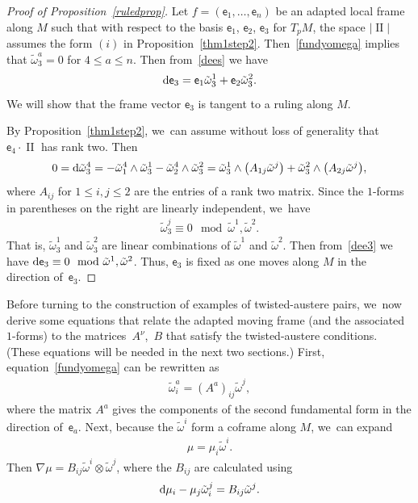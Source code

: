 \documentclass[pdftex]{sigma}
\def\ve{\mathsf{e}}
\def\II{\operatorname{II}} %
\def\tw{\tilde\omega}
\def\wt{\tilde\omega}
\numberwithin{equation}{section}
\begin{document}
\begin{proof}[Proof of Proposition~\ref{ruledprop}]
Let $f=(\ve_1, \dots, \ve_n)$ be an adapted local frame along $M$ such that with respect to the basis $\ve_1$, $\ve_2$, $\ve_3$ for $T_p M$, the space $|\II|$ assumes the form $(i)$ in Proposition~\ref{thm1step2}. Then~\eqref{fundyomega} implies that $\wt^a_3=0$ for $4 \le a \le n$. Then from~\eqref{dees} we have
\begin{gather} \label{dee3}
{\rm d}\ve_3 = \ve_1 \wt^1_3 + \ve_2 \wt^2_3.
\end{gather}
We will show that the frame vector $\ve_3$ is tangent to a ruling along $M$.

By Proposition~\ref{thm1step2}, we~can assume without loss of generality that $\ve_4 \cdot \II$ has rank two. Then
\begin{gather*}
0 = {\rm d}\wt^4_3 = -\wt^4_1 \wedge \wt^1_3 - \wt^4_2 \wedge \wt^2_3 = \wt^1_3 \wedge \big(A_{1j} \wt^j\big) + \wt^2_3 \wedge \big(A_{2j} \wt^j\big),
\end{gather*}
where $A_{ij}$ for $1\le i,j \le 2$ are the entries of a rank two matrix. Since the $1$-forms in parentheses on the right are linearly independent, we~have
\begin{gather} \label{noturn}
\wt^j_3 \equiv 0 \mod \wt^1, \wt^2.
\end{gather}
That is, $\wt^1_3$ and $\wt^2_3$ are linear combinations of $\wt^1$ and $\wt^2$. Then from~\eqref{dee3} we have ${\rm d}\ve_3 \equiv 0 \mod \wt^1, \wt^2$. Thus, $\ve_3$ is fixed as one moves along $M$ in the direction of~$\ve_3$.
\end{proof}

Before turning to the construction of examples of twisted-austere pairs, we~now derive some equations that relate the adapted moving frame (and the associated
$1$-forms) to the matri\-ces~$A^\nu$,~$B$ that satisfy the twisted-austere conditions. (These equations will be needed in the next two sections.)
First, equation~\eqref{fundyomega} can be rewritten as
\begin{gather} \label{waiA}
\tw^a_i = (A^a)_{ij} \tw^j,
\end{gather}
where the matrix $A^a$ gives the components of the second fundamental form in the direction of~$\ve_a$. Next, because the $\wt^i$ form a coframe
along $M$, we~can expand
\begin{gather*} %
\mu = \mu_i \tw^i.
\end{gather*}
Then $\nabla \mu = B_{ij} \wt^i \otimes \wt^j$, where the $B_{ij}$ are calculated using
\begin{gather} \label{demuse}
{\rm d}\mu_i - \mu_j \wt^j_i = B_{ij} \wt^j.
\end{gather}
\end{document}
